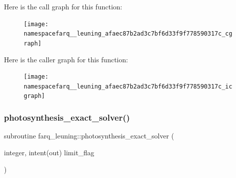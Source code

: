 Here is the call graph for this function\+:
\nopagebreak
\begin{figure}[H]
\begin{center}
\leavevmode
\texttt{[image: namespacefarq\_\_leuning\_afaec87b2ad3c7bf6d33f9f778590317c\_cgraph]}
\end{center}
\end{figure}
Here is the caller graph for this function\+:
\nopagebreak
\begin{figure}[H]
\begin{center}
\leavevmode
\texttt{[image: namespacefarq\_\_leuning\_afaec87b2ad3c7bf6d33f9f778590317c\_icgraph]}
\end{center}
\end{figure}
\mbox{\label{namespacefarq__leuning_a874ab59c974d12da5a8ea01c48dd089c}} 
\subsubsection{\texorpdfstring{photosynthesis\+\_\+exact\+\_\+solver()}{photosynthesis\_exact\_solver()}}
{\footnotesize\ttfamily subroutine farq\+\_\+leuning\+::photosynthesis\+\_\+exact\+\_\+solver (\begin{DoxyParamCaption}\item[{integer, intent(out)}]{limit\+\_\+flag }\end{DoxyParamCaption})}

